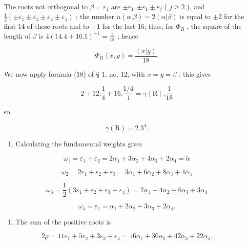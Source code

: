 The roots not orthogonal to \(\beta = \varepsilon_1\) are \(\pm \varepsilon_1, \pm \varepsilon_1 \pm \varepsilon_j\) ( \(j \geqslant 2\) ), and \(\frac{1}{2} (\pm \varepsilon_1 \pm \varepsilon_2 \pm \varepsilon_3 \pm \varepsilon_4)\) ; the number \(n(\alpha | \beta) = 2(\alpha | \beta)\) is equal to \(\pm 2\) for the first 14 of these roots and to \(\pm 1\) for the last 16; thus, for \(\Phi_R\) , the square of the length of \(\beta\) is \(4(14.4 + 16.1)^{-1} = \frac{1}{18}\) ; hence

\[
\Phi_ {R} (x, y) = \frac {(x | y)}{18}.
\]

We now apply formula (18) of § 1, no. 12, with \(x = y = \beta\) ; this gives

\[
2 + 12. \frac {1}{4} + 16. \frac {1 / 4}{1} = \gamma (\mathrm{R}). \frac {1}{18}
\]

so

\[
\gamma (\mathrm{R}) = 2. 3 ^ {4}.
\]

\begin{enumerate}
\def\labelenumi{(\Roman{enumi})}
\setcounter{enumi}{5}
\tightlist
\item
  Calculating the fundamental weights gives
\end{enumerate}

\[
\omega_ {1} = \varepsilon_ {1} + \varepsilon_ {2} = 2 \alpha_ {1} + 3 \alpha_ {2} + 4 \alpha_ {3} + 2 \alpha_ {4} = \tilde {\alpha}
\]

\[
\omega_ {2} = 2 \varepsilon_ {1} + \varepsilon_ {2} + \varepsilon_ {3} = 3 \alpha_ {1} + 6 \alpha_ {2} + 8 \alpha_ {3} + 4 \alpha_ {4}
\]

\[
\omega_ {3} = \frac {1}{2} (3 \varepsilon_ {1} + \varepsilon_ {2} + \varepsilon_ {3} + \varepsilon_ {4}) = 2 \alpha_ {1} + 4 \alpha_ {2} + 6 \alpha_ {3} + 3 \alpha_ {4}
\]

\[
\omega_ {4} = \varepsilon_ {1} = \alpha_ {1} + 2 \alpha_ {2} + 3 \alpha_ {3} + 2 \alpha_ {4}.
\]

\begin{enumerate}
\def\labelenumi{(\Roman{enumi})}
\setcounter{enumi}{6}
\tightlist
\item
  The sum of the positive roots is
\end{enumerate}

\[
2 \rho = 11 \varepsilon_ {1} + 5 \varepsilon_ {2} + 3 \varepsilon_ {3} + \varepsilon_ {4} = 16 \alpha_ {1} + 30 \alpha_ {2} + 42 \alpha_ {3} + 22 \alpha_ {4}.
\]

